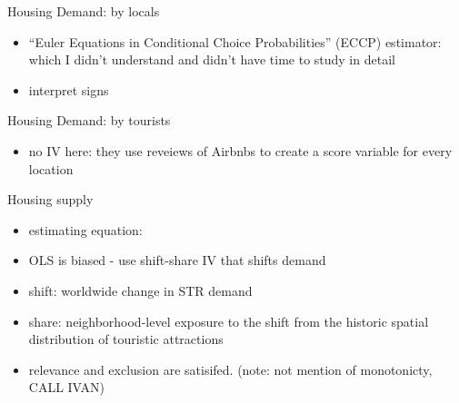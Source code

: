 \begin{frame}{Housing Demand: by locals}
    \begin{itemize}
        \item “Euler Equations in Conditional Choice Probabilities” (ECCP) estimator: which I didn't understand and didn't have time to study in detail
        \begin{figure}
            \centering
            \caption{}
            \label{fig:photo}
        \end{figure}
        \item interpret signs
    \end{itemize}
\end{frame}

\begin{frame}{Housing Demand: by tourists}
    \begin{itemize}
        \item no IV here: they use reveiews of Airbnbs to create a score variable for every location
        \begin{figure}
            \centering
            \caption{}
            \label{fig:photo}
        \end{figure}
    \end{itemize}
\end{frame}

\begin{frame}{Housing supply}
    \begin{itemize}
        \item estimating equation:
        \begin{figure}
            \centering
            \caption{}
            \label{fig:photo}
        \end{figure}
        \item OLS is biased - use shift-share IV that shifts demand 
        \item shift: worldwide change in STR demand 
        \item share: neighborhood-level exposure to the shift from the historic spatial distribution of touristic attractions
        \item relevance and exclusion are satisifed. (note: not mention of monotonicty, CALL IVAN)
    \end{itemize}
\end{frame}

